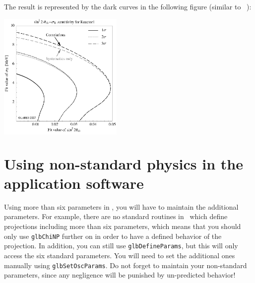 {The result is represented by the dark curves
 in the following figure (similar to \Ref~\cite{Blennow:2005yk}):
\begin{center}
\colorbox{white}{\includegraphics[width=6cm]{reactorNSI}}
\end{center}
}

\section{Using non-standard physics in the application software}

Using more than six parameters in \GLOBES , you will have to maintain the additional parameters. 
For example, there are no standard routines in \GLOBES\ which define projections including more than six parameters, 
which means that you should only use {\tt glbChiNP} further on in order to have a defined behavior
of the projection. In addition, you can still use {\tt glbDefineParams}, but this 
will only access the six standard parameters. You will need to set the additional ones manually using {\tt glbSetOscParams}. 
Do not forget to maintain your non-standard parameters, since any negligence will be punished by un-predicted behavior!

